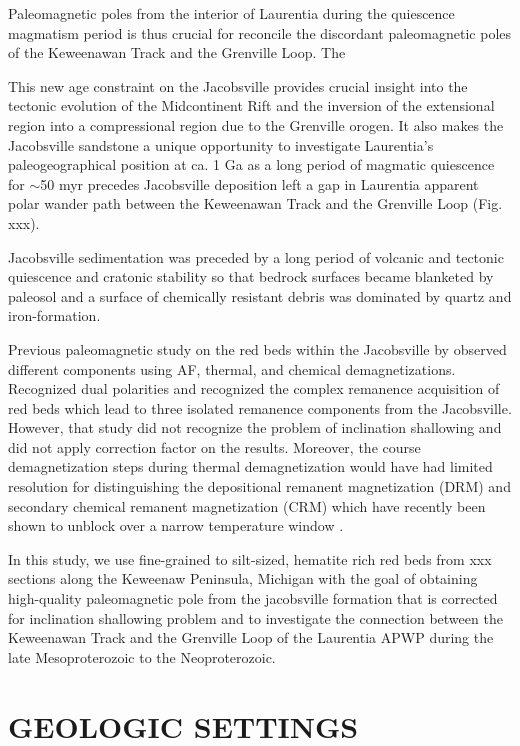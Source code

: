 \documentclass[draft]{agujournal2019}
\begin{document}
Paleomagnetic poles from the interior of Laurentia during the quiescence magmatism period is thus crucial for reconcile the discordant paleomagnetic poles of the Keweenawan Track and the Grenville Loop. The

This new age constraint on the Jacobsville provides crucial insight into the tectonic evolution of the Midcontinent Rift and the inversion of the extensional region into a compressional region due to the Grenville orogen. It also makes the Jacobsville sandstone a unique opportunity to investigate Laurentia's paleogeographical position at ca. 1 Ga as a long period of magmatic quiescence for $\sim$50 myr precedes Jacobsville deposition left a gap in Laurentia apparent polar wander path between the Keweenawan Track and the Grenville Loop (Fig. xxx). 

Jacobsville sedimentation was preceded by a long period of volcanic and tectonic quiescence and cratonic stability so that bedrock surfaces became blanketed by paleosol and a surface of chemically resistant debris was dominated by quartz and iron-formation. 

Previous paleomagnetic study on the red beds within the Jacobsville by \cite{Roy1978a} observed different components using AF, thermal, and chemical demagnetizations. Recognized dual polarities and recognized the complex remanence acquisition of red beds which lead to three isolated remanence components from the Jacobsville. However, that study did not recognize the problem of inclination shallowing and did not apply correction factor on the results. Moreover, the course demagnetization steps during thermal demagnetization would have had limited resolution for distinguishing the depositional remanent magnetization (DRM) and secondary chemical remanent magnetization (CRM) which have recently been shown to unblock over a narrow temperature window \cite{Swanson-Hysell2019b}. 

In this study, we use fine-grained to silt-sized, hematite rich red beds from xxx sections along the Keweenaw Peninsula, Michigan with the goal of obtaining high-quality paleomagnetic pole from the jacobsville formation that is corrected for inclination shallowing problem and to investigate the connection between the Keweenawan Track and the Grenville Loop of the Laurentia APWP during the late Mesoproterozoic to the Neoproterozoic. 

\section*{GEOLOGIC SETTINGS}
\end{document}
